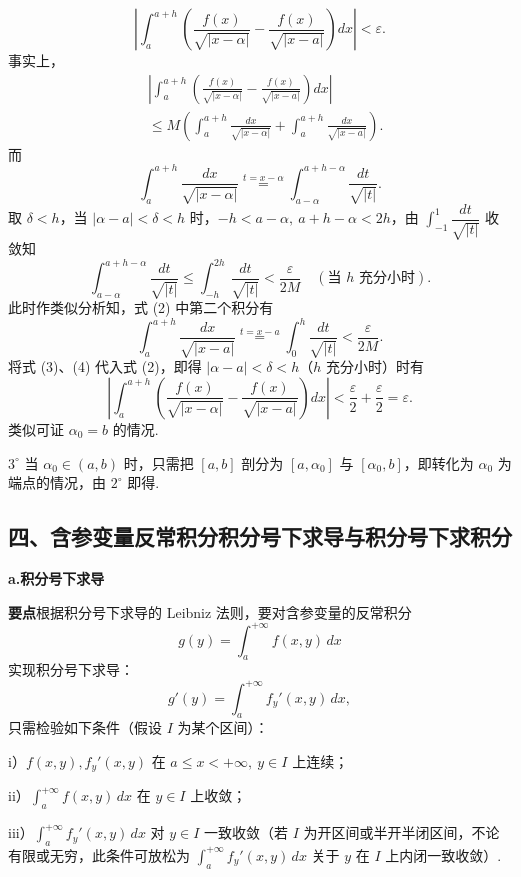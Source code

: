 \documentclass[UTF8, 12pt, fontset=fandol, oneside]{ctexart}
\begin{document}
\[
\left|\int_a^{a+h}\left(\frac{f(x)}{\sqrt{|x-\alpha|}}-\frac{f(x)}{\sqrt{|x-a|}}\right)dx\right|<\varepsilon.
\]
事实上，
\[
\begin{aligned}
&\left|\int_a^{a+h}\left(\frac{f(x)}{\sqrt{|x-\alpha|}}-\frac{f(x)}{\sqrt{|x-a|}}\right)dx\right|\\
&\le M\left(\int_a^{a+h}\frac{dx}{\sqrt{|x-\alpha|}}+\int_a^{a+h}\frac{dx}{\sqrt{|x-a|}}\right).
\end{aligned}
\tag{2}
\]
而
\[
\int_a^{a+h}\frac{dx}{\sqrt{|x-\alpha|}}
\overset{t=x-\alpha}{=}\int_{a-\alpha}^{a+h-\alpha}\frac{dt}{\sqrt{|t|}}.
\]
取 $\delta<h$，当 $|\alpha-a|<\delta<h$ 时，$-h<a-\alpha,\ a+h-\alpha<2h$，由 $\displaystyle\int_{-1}^{1}\dfrac{dt}{\sqrt{|t|}}$ 收敛知
\[
\int_{a-\alpha}^{a+h-\alpha}\frac{dt}{\sqrt{|t|}}
\le\int_{-h}^{2h}\frac{dt}{\sqrt{|t|}}<\frac{\varepsilon}{2M}\quad(\text{当 }h\text{ 充分小时}).
\tag{3}
\]
此时作类似分析知，式 (2) 中第二个积分有
\[
\int_a^{a+h}\frac{dx}{\sqrt{|x-a|}}
\overset{t=x-a}{=}\int_0^h\frac{dt}{\sqrt{|t|}}<\frac{\varepsilon}{2M}.
\tag{4}
\]
将式 (3)、(4) 代入式 (2)，即得 $|\alpha-a|<\delta<h$（$h$ 充分小时）时有
\[
\left|\int_a^{a+h}\left(\frac{f(x)}{\sqrt{|x-\alpha|}}-\frac{f(x)}{\sqrt{|x-a|}}\right)dx\right|<\frac{\varepsilon}{2}+\frac{\varepsilon}{2}=\varepsilon.
\]
类似可证 $\alpha_0=b$ 的情况.

$3^\circ$ 当 $\alpha_0\in(a,b)$ 时，只需把 $[a,b]$ 剖分为 $[a,\alpha_0]$ 与 $[\alpha_0,b]$，即转化为 $\alpha_0$ 为端点的情况，由 $2^\circ$ 即得.

\subsection*{四、含参变量反常积分积分号下求导与积分号下求积分}

\noindent\textbf{a.\quad 积分号下求导}

\noindent\textbf{要点}\quad 根据积分号下求导的 Leibniz 法则，要对含参变量的反常积分
\[
g(y)=\int_a^{+\infty}f(x,y)\,dx
\]
实现积分号下求导：
\[
g'(y)=\int_a^{+\infty}f_y'(x,y)\,dx,
\]
只需检验如下条件（假设 $I$ 为某个区间）：

i）$f(x,y),f_y'(x,y)$ 在 $a\le x<+\infty,\ y\in I$ 上连续；

ii）$\displaystyle\int_a^{+\infty}f(x,y)\,dx$ 在 $y\in I$ 上收敛；

iii）$\displaystyle\int_a^{+\infty}f_y'(x,y)\,dx$ 对 $y\in I$ 一致收敛（若 $I$ 为开区间或半开半闭区间，不论有限或无穷，此条件可放松为 $\displaystyle\int_a^{+\infty}f_y'(x,y)\,dx$ 关于 $y$ 在 $I$ 上内闭一致收敛）.
\end{document}
